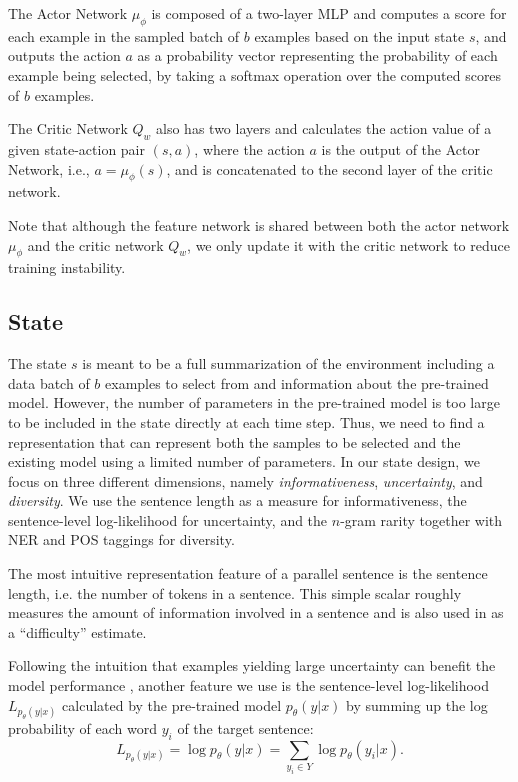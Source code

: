 \documentclass[letterpaper]{article}
\begin{document}
The Actor Network $\mu_\phi$ is composed of a two-layer MLP and computes a score for each example in the sampled batch of $b$ examples based on the input state $s$, and outputs the action $a$ as a probability vector representing the probability of each example being selected, by taking a softmax operation over the computed scores of $b$ examples.

The Critic Network $Q_w$ also has two layers and calculates the action value of a given state-action pair $(s,a)$, where the action $a$ is the output of the Actor Network, i.e., $a=\mu_\phi(s)$, and is concatenated to the second layer of the critic network.

Note that although the feature network is shared between both the actor network $\mu_\phi$ and the critic network $Q_w$, we only update it with the critic network to reduce training instability.

\subsection{State}
\label{subsec:state}

The state $s$ is meant to be a full summarization of the environment including a data batch of $b$ examples to select from and information about the pre-trained model. However, the number of parameters in the pre-trained model is too large to be included in the state directly at each time step. Thus, we need to find a representation that can represent both the samples to be selected and the existing model using a limited number of parameters. In our state design, we focus on three different dimensions, namely \emph{informativeness}, \emph{uncertainty}, and \emph{diversity}. We use the sentence length as a measure for informativeness, the sentence-level log-likelihood for uncertainty, and the $n$-gram rarity together with NER and POS taggings for diversity.

The most intuitive representation feature of a parallel sentence is the sentence length, i.e. the number of tokens in a sentence. This simple scalar roughly measures the amount of information involved in a sentence and is also used in \cite{platanios2019competence} as a ``difficulty'' estimate.

Following the intuition that examples yielding large uncertainty can benefit the model performance \cite{li2006confidence}, another feature we use is the sentence-level log-likelihood $L_{p_\theta(y|x)}$ calculated by the pre-trained model $p_\theta(y|x)$ by summing up the log probability of each word $y_i$ of the target sentence:
\begin{equation}
	\label{eq:logp}
	L_{p_{\theta}(y|x)} = \log p_\theta(y|x) = \sum_{y_i \in Y} \log p_\theta(y_i|x).
\end{equation}
\end{document}
